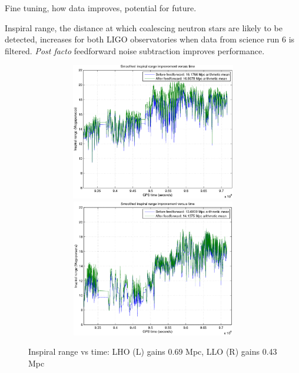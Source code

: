             Fine tuning, how data improves, potential for future.

Inspiral range, the distance at which coalescing neutron stars are likely to be detected, increases for both LIGO observatories when data from science run 6 is filtered. \textit{Post facto} feedforward noise subtraction improves performance.

\begin{figure}
\includegraphics[height=60mm, width=120mm]{clip-range-LHO-new.eps}
\includegraphics[height=60mm, width=120mm]{clip-range-LLO-new.eps}
\caption{Inspiral range vs time:
LHO (L) gains 0.69 Mpc, LLO (R) gains 0.43 Mpc}
\end{figure}
